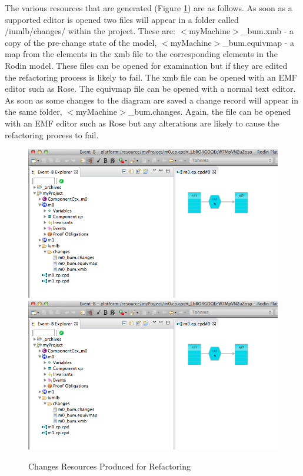 The various resources that are generated (Figure \ref{fig:ChangesResourcesProducedForRefactoring}) are as follows. 
As soon as a supported editor is opened two files will appear in a folder called /iumlb/changes/ within the project. These are:
$<$myMachine$>$\_bum.xmb  -  a copy of the pre-change state of the model,
$<$myMachine$>$\_bum.equivmap - a map from the elements in the xmb file to the corresponding elements in the Rodin  model. 
These files can be opened for examination but if they are edited the refactoring process is likely to fail. The xmb file can be opened with an EMF editor such as Rose. The equivmap file can be opened with a normal text editor.
As soon as some changes to the diagram are saved a change record will appear in the same folder, $<$myMachine$>$\_bum.changes.  Again, the file can be opened with an EMF editor such as Rose but any alterations are likely to cause the refactoring process to fail.

 \begin{figure}[!htbp]
  \centering
  \ifplastex
  \includegraphics[width=1024]{figures/image66.png}
  \else
  \includegraphics[width=1\textwidth]{figures/image66.png}
  \fi
  \caption{Changes Resources Produced for Refactoring}
  \label{fig:ChangesResourcesProducedForRefactoring}
\end{figure} 

